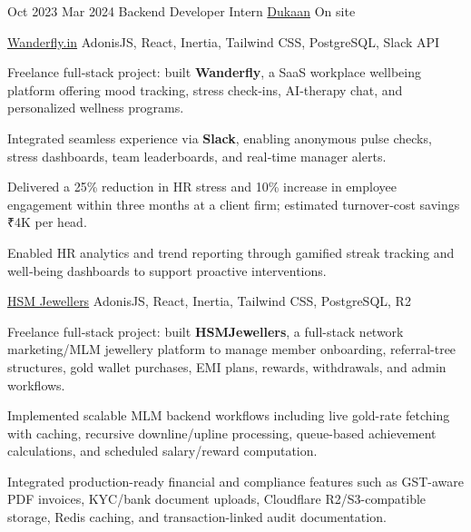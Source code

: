 {Oct 2023}
{Mar 2024}
{Backend Developer Intern}
{\href{https://mydukaan.io}{Dukaan}}
{On site}
{
\jbegin
\jend
}

{}
{\href{https://www.wanderfly.in}{Wanderfly.in}}
{AdonisJS, React, Inertia, Tailwind CSS, PostgreSQL, Slack API}
{\jbegin
    \item{Freelance full‑stack project: built \textbf{Wanderfly}, a SaaS workplace wellbeing platform offering mood tracking, stress check‑ins, AI‑therapy chat, and personalized wellness programs.}
    \item {Integrated seamless experience via \textbf{Slack}, enabling anonymous pulse checks, stress dashboards, team leaderboards, and real‑time manager alerts.}
    \item {Delivered a 25\% reduction in HR stress and 10\% increase in employee engagement within three months at a client firm; estimated turnover‑cost savings ₹4K per head.}
    \item {Enabled HR analytics and trend reporting through gamified streak tracking and well‑being dashboards to support proactive interventions.}
\jend}

{}
{\href{https://hsmjewellers.com}{HSM Jewellers}}
{AdonisJS, React, Inertia, Tailwind CSS, PostgreSQL, R2}
{\jbegin
    \item{Freelance full‑stack project: built \textbf{HSMJewellers}, a full-stack network marketing/MLM jewellery platform to manage member onboarding, referral-tree structures, gold wallet purchases, EMI plans, rewards, withdrawals, and admin workflows.}
    \item {Implemented scalable MLM backend workflows including live gold-rate fetching with caching, recursive downline/upline processing, queue-based achievement calculations, and scheduled salary/reward computation.}
    \item {Integrated production-ready financial and compliance features such as GST-aware PDF invoices, KYC/bank document uploads, Cloudflare R2/S3-compatible storage, Redis caching, and transaction-linked audit documentation.}
\jend}

